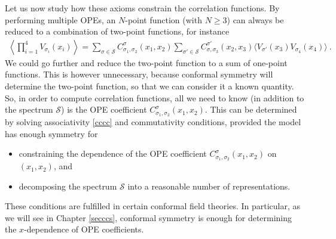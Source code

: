 \documentclass[12pt, a4paper, notitlepage, twoside]{report}
\numberwithin{equation}{section}
\theoremstyle{break}
\begin{document}
Let us now study how these axioms constrain the correlation functions.
By performing multiple OPEs, an $N$-point function (with $N\geq 3$) can always be reduced to a combination of two-point functions, for instance
\begin{align}
 \left\langle \prod_{i=1}^4 V_{\sigma_i}(x_i) \right\rangle = \sum_{\sigma\in \mathcal{S}} C_{\sigma_1,\sigma_2}^{\sigma}(x_1,x_2)\sum_{\sigma'\in \mathcal{S}} C_{\sigma,\sigma_3}^{\sigma'}(x_2,x_3)\Big\langle V_{\sigma'}(x_3)V_{\sigma_4}(x_4)\Big\rangle\ .
\end{align}
We could go further and reduce the two-point function to a sum of one-point functions.
This is however unnecessary, because conformal symmetry will determine the two-point function, so that we can consider it a known quantity.
So, in order to compute correlation functions, all we need to know (in addition to the spectrum $\mathcal{S}$) is the OPE coefficient $C_{\sigma_1,\sigma_2}^{\sigma}(x_1,x_2)$.
This can be determined by solving associativity \eqref{cccc} and commutativity conditions, provided the model has enough symmetry for 
\begin{itemize}
 \item constraining the dependence of the OPE coefficient $C_{\sigma_1,\sigma_2}^{\sigma}(x_1,x_2)$ on $(x_1,x_2)$, and
\item decomposing the spectrum $\mathcal{S}$ into a reasonable number of representations.
\end{itemize}
These conditions are fulfilled in certain conformal field theories.
In particular, as we will see in Chapter \ref{secccs}, conformal symmetry is enough for determining the $x$-dependence of OPE coefficients. 
\end{document}
